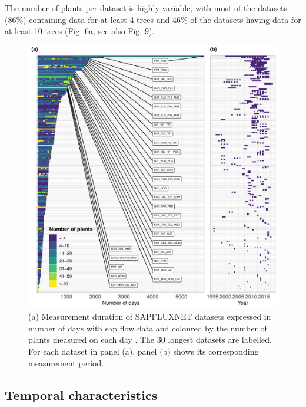 \documentclass[11pt,twoside]{reedthesis}
\begin{document}
The number of plants per dataset is highly variable, with most of the
datasets (86\%) containing data for at least 4 trees and 46\% of the
datasets having data for at least 10 trees (Fig. 6a, see also Fig. 9).
\par

\setlength{\abovecaptionskip}{0pt}
\begin{figure}[hbt!]

{\centering \includegraphics[width=1\linewidth]{figure/CH3/Figure6} 

}

\caption[Duration and number of plants mesured in each dataset.]{(a) Measurement duration of SAPFLUXNET datasets expressed in number of days with sap flow data and coloured by the number of plants measured on each day . The 30 longest datasets are labelled. For each dataset in panel (a), panel (b) shows its corresponding measurement period.}\label{fig:Ch2plot6}
\end{figure}
\subsection{Temporal characteristics}\label{temporal-characteristics}
\end{document}
